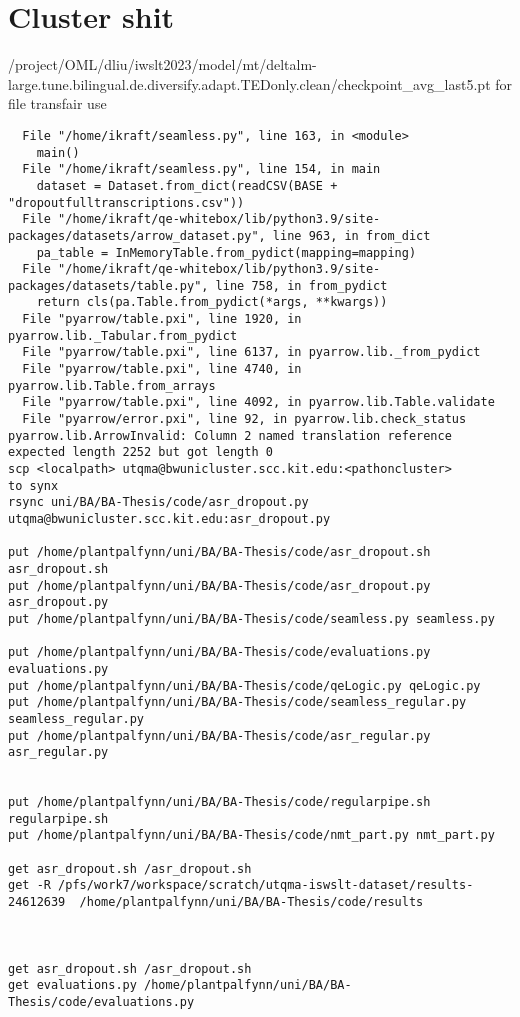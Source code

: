 \section{Cluster shit}
/project/OML/dliu/iwslt2023/model/mt/deltalm-large.tune.bilingual.de.diversify.adapt.TEDonly.clean/checkpoint_avg_last5.pt
for file transfair use
\begin{verbatim}
  File "/home/ikraft/seamless.py", line 163, in <module>
    main()
  File "/home/ikraft/seamless.py", line 154, in main
    dataset = Dataset.from_dict(readCSV(BASE + "dropoutfulltranscriptions.csv"))
  File "/home/ikraft/qe-whitebox/lib/python3.9/site-packages/datasets/arrow_dataset.py", line 963, in from_dict
    pa_table = InMemoryTable.from_pydict(mapping=mapping)
  File "/home/ikraft/qe-whitebox/lib/python3.9/site-packages/datasets/table.py", line 758, in from_pydict
    return cls(pa.Table.from_pydict(*args, **kwargs))
  File "pyarrow/table.pxi", line 1920, in pyarrow.lib._Tabular.from_pydict
  File "pyarrow/table.pxi", line 6137, in pyarrow.lib._from_pydict
  File "pyarrow/table.pxi", line 4740, in pyarrow.lib.Table.from_arrays
  File "pyarrow/table.pxi", line 4092, in pyarrow.lib.Table.validate
  File "pyarrow/error.pxi", line 92, in pyarrow.lib.check_status
pyarrow.lib.ArrowInvalid: Column 2 named translation reference expected length 2252 but got length 0
scp <localpath> utqma@bwunicluster.scc.kit.edu:<pathoncluster>
to synx
rsync uni/BA/BA-Thesis/code/asr_dropout.py utqma@bwunicluster.scc.kit.edu:asr_dropout.py

put /home/plantpalfynn/uni/BA/BA-Thesis/code/asr_dropout.sh asr_dropout.sh
put /home/plantpalfynn/uni/BA/BA-Thesis/code/asr_dropout.py asr_dropout.py
put /home/plantpalfynn/uni/BA/BA-Thesis/code/seamless.py seamless.py

put /home/plantpalfynn/uni/BA/BA-Thesis/code/evaluations.py evaluations.py
put /home/plantpalfynn/uni/BA/BA-Thesis/code/qeLogic.py qeLogic.py
put /home/plantpalfynn/uni/BA/BA-Thesis/code/seamless_regular.py seamless_regular.py
put /home/plantpalfynn/uni/BA/BA-Thesis/code/asr_regular.py asr_regular.py


put /home/plantpalfynn/uni/BA/BA-Thesis/code/regularpipe.sh regularpipe.sh
put /home/plantpalfynn/uni/BA/BA-Thesis/code/nmt_part.py nmt_part.py

get asr_dropout.sh /asr_dropout.sh
get -R /pfs/work7/workspace/scratch/utqma-iswslt-dataset/results-24612639  /home/plantpalfynn/uni/BA/BA-Thesis/code/results



get asr_dropout.sh /asr_dropout.sh
get evaluations.py /home/plantpalfynn/uni/BA/BA-Thesis/code/evaluations.py
 

\end{verbatim}

